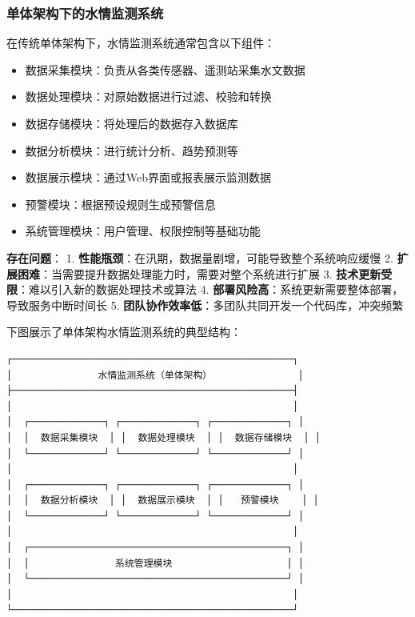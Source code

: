 \subsubsection{单体架构下的水情监测系统}\label{ux5355ux4f53ux67b6ux6784ux4e0bux7684ux6c34ux60c5ux76d1ux6d4bux7cfbux7edf}

在传统单体架构下，水情监测系统通常包含以下组件：

\begin{itemize}
\tightlist
\item
  数据采集模块：负责从各类传感器、遥测站采集水文数据
\item
  数据处理模块：对原始数据进行过滤、校验和转换
\item
  数据存储模块：将处理后的数据存入数据库
\item
  数据分析模块：进行统计分析、趋势预测等
\item
  数据展示模块：通过Web界面或报表展示监测数据
\item
  预警模块：根据预设规则生成预警信息
\item
  系统管理模块：用户管理、权限控制等基础功能
\end{itemize}

\textbf{存在问题}： 1.
\textbf{性能瓶颈}：在汛期，数据量剧增，可能导致整个系统响应缓慢 2.
\textbf{扩展困难}：当需要提升数据处理能力时，需要对整个系统进行扩展 3.
\textbf{技术更新受限}：难以引入新的数据处理技术或算法 4.
\textbf{部署风险高}：系统更新需要整体部署，导致服务中断时间长 5.
\textbf{团队协作效率低}：多团队共同开发一个代码库，冲突频繁

下图展示了单体架构水情监测系统的典型结构：

\begin{lstlisting}
┌─────────────────────────────────────────────────┐
│               水情监测系统（单体架构）               │
├─────────────────────────────────────────────────┤
│                                                 │
│  ┌─────────────┐ ┌─────────────┐ ┌─────────────┐ │
│  │  数据采集模块  │ │  数据处理模块  │ │  数据存储模块  │ │
│  └─────────────┘ └─────────────┘ └─────────────┘ │
│                                                 │
│  ┌─────────────┐ ┌─────────────┐ ┌─────────────┐ │
│  │  数据分析模块  │ │  数据展示模块  │ │   预警模块    │ │
│  └─────────────┘ └─────────────┘ └─────────────┘ │
│                                                 │
│  ┌─────────────────────────────────────────────┐ │
│  │               系统管理模块                    │ │
│  └─────────────────────────────────────────────┘ │
│                                                 │
└─────────────────────────────────────────────────┘
\end{lstlisting}

